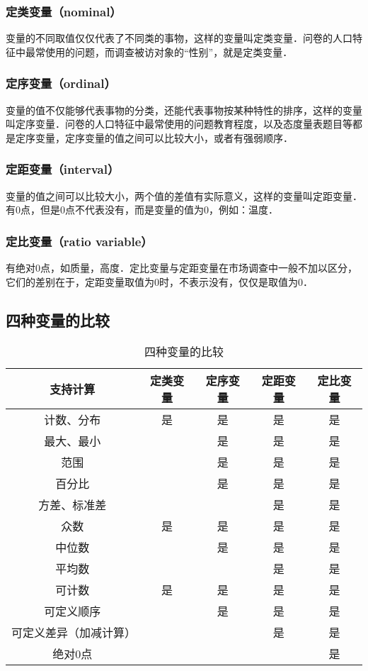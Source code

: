 \subsubsection{定类变量（nominal）}
变量的不同取值仅仅代表了不同类的事物，这样的变量叫定类变量．问卷的人口特征中最常使用的问题，而调查被访对象的“性别”，就是定类变量．
\subsubsection{定序变量（ordinal）}
变量的值不仅能够代表事物的分类，还能代表事物按某种特性的排序，这样的变量叫定序变量．问卷的人口特征中最常使用的问题教育程度，以及态度量表题目等都是定序变量，定序变量的值之间可以比较大小，或者有强弱顺序．
\subsubsection{定距变量（interval）}
变量的值之间可以比较大小，两个值的差值有实际意义，这样的变量叫定距变量．有0点，但是0点不代表没有，而是变量的值为0，例如：温度．
\subsubsection{定比变量（ratio variable）}
有绝对0点，如质量，高度．定比变量与定距变量在市场调查中一般不加以区分，它们的差别在于，定距变量取值为0时，不表示没有，仅仅是取值为0．
\subsection{四种变量的比较}
\begin{table}[ht]
\centering
\caption{四种变量的比较}\label{DatTyp_tab1}
\begin{tabular}{|c|c|c|c|c|}
\hline
支持计算 & 定类变量 & 定序变量 & 定距变量 & 定比变量 \\
\hline
计数、分布 & 是 & 是 & 是 & 是 \\
\hline
最大、最小 &   & 是 & 是 & 是 \\
\hline
范围 &   & 是 & 是 & 是 \\
\hline
百分比 &   & 是 & 是 & 是 \\
\hline
方差、标准差 &   &   & 是 & 是 \\
\hline
众数 & 是 & 是 & 是 & 是 \\
\hline
中位数 &   & 是 & 是 & 是 \\
\hline
平均数 &   &   & 是 & 是 \\
\hline
可计数 & 是 & 是 & 是 & 是 \\
\hline
可定义顺序 &   & 是 & 是 & 是 \\
\hline
可定义差异（加减计算） &   &   & 是 & 是 \\
\hline
绝对0点 &   &   &   & 是 \\
\hline
\end{tabular}
\end{table}
